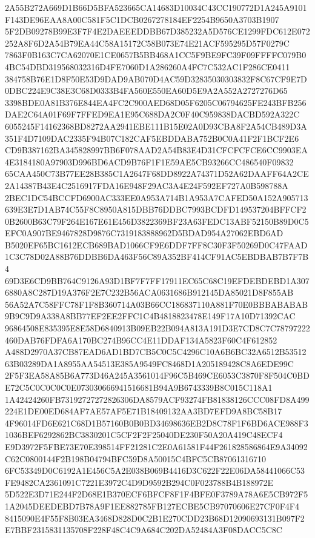 \documentclass[UTF8,fontset=fandol,zihao=-4,a4paper]{ctexart}
\begin{document}
{{2A55B272A669D1B66D5BFA523665CA14683D10034C43CC190772D1A245A9101F143DE96EAA8A00C581F5C1DCB0267278184EF2254B9650A3703B1907
5F2DB09278B99E3F7F4E2DAEEEDDBB67D385232A5D576CE1299FDC612E072252A8F6D2A54B79EA44C58A15172C58B073E74E21ACF595295D57F0279C
7863F0B163C7CA62070E1CE0657B5BB468A1CC5F9BE9FC39F09FFFFC079B04BC54DBD319568032316D4FE7060D1A286260A4FC7C532AC1F286CE0411
384758B76E1D8F50E53D9DAD9AB070D4AC59D32835030303832F8C67CF9E7D0DBC224E9C38E3C68D0333B4FA560E550EA60D5E9A2A552A2727276D65
3398BDE0A81B376E844EA4FC2C900AED68D05F6205C06794625FE243BFB256DAE2C64A01F69F7FFED9EA1E95C688DA2C0F40C959838DACBD592A322C
6055245F14162368BD8272AA2941EBE111B15E02A0D93CBA8F2A54CB489D3A351F4D7109DAC2335F94B07C182CAF5EBDDABA752B0C0A41F2F1BCF2E6
CD9B387162BA345828997BB6F078AAD2A54B83E4D31CFCFCFCE6CC9903EA4E3184180A97903D996BD6ACD9B76F1F1E59AE5CB93266CC486540F09832
65CAA450C73B77EE28B385C1A2647F68DD8922A74371D52A62DAAFF64A2CE2A14387B43E4C2516917FDA16E948F29AC3A4E24F592EF727A0B598788A
2BEC1DC54BCCFD6900AC333EE0A953A714B1A953A7CAFED50A152A905713639E3E7D1AB74C55F8C8950A815DBB76DDBC7993BCDFD149537204BFFCF2
0B2600B63C79F264E167E61E456D3822369BF23A63FEDC13ABF52150B89D0C5EFC0A907BE9467828D9876C7319183888962D5BDAD954A27062EBD6AD
B5020EF65BC1612ECB689BAD1066CF9E6DDF7FF8C30F3F50269D0C47FAAD1C3C78D02A88B76DDBB6DA463F56C89A352BF414CF91AC5EBDBAB7B7F7B4
69D3E6CD9BB764C9126A93D1BF7F7FF17911EC65C68C19EFDEBDEBD1A3076880A8C287D19A376F2E7C232B56ACA0631686B912145DA85021D8F855AB
56A52A7C58FFC78F1F8B360714A03B66CC186837110A881F70E0BBBABABAB9B9C9D9A338A8BB77EF2EE2FFC1C4B4818823478E149F17A10D71392CAC
96864508E835395E8E58D6840913B09EB22B094A813A191D3E7CD8C7C78797222460DAB76FDFA6A170BC274B96CC4E11DDAF134A5823F60C4F612852
A488D2970A37CB87EAD6AD1BD7CB5C0C5C4296C10A6B6BC32A6512B5351263B03289DA1A8955AA54513E385A9549FC8468D1A205189428C8A6EDE99C
2F5F3EA58A85B6A773D46A245A3561014F96C5B469CE6053C3870F8F504C0BDE72C5C0C0C0C0E073030666941516681B94A9B6743339B8C015C118A1
1A42424260FB73192727272826306DA8579ACF93274FB81838126CCC08FD8A499224E1DE00ED684AF7AE57AF5E71B18409132AA3BD7EFD9A8BC58B17
4F96014FD6E621C68D1B57160B0B0BD34698636EB2D8C78F1F6BD6ACE988F31036BEF6292862BC3830201C5CF2F2F25040DE230F50A20A419C48ECF4
E9D3972F5FBE73E70E398514FF21281C2E0A61581F44F261828586864E9A34092C62C0800144F2B198B04794BFC59D8A50015C4BFC5CB87061316710
6FC53349D0C6192A1E456C5A2E038B069B4416D3C622F22E06DA58441066C53FE9482CA2361091C7221E3972C4D9D9592B294C0F023788B4B188972E
5D522E3D71E244F2D68E1B370ECF6BFCF8F1F4BFE0F3789A78A6E5CB972F51A2045DEEDEBD7B78A9F1EE882785FB127ECBE5CB97070606E27CF0F4F4
8415090E4F55F8B03EA3468D828D0C2B1E270CDD23B68D12090693131B097F2E7BBF2315831135708F228F48C4C9A684C202DA52484A3F08DACC5C8C
}}
\end{document}
